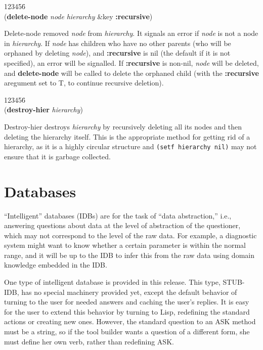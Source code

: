 \begin{tabbing}
123456\= \kill
\\
({\bf delete-node} {\it node\/} {\it hierarchy\/} \&key {\bf :recursive}) 
\end{tabbing}
Delete-node removed {\it node} from {\it hierarchy\/}. It signals an
error if {\it node} is not a node in {\it hierarchy}. If {\it node}
has children who have no other parents (who will be orphaned by
deleting {\it node\/}), and {\bf :recursive} is nil (the default if it
is not specified), an error will be signalled. If {\bf :recursive} is
non-nil, {\it node} will be deleted, and {\bf delete-node} will be
called to delete the orphaned child (with the {\bf :recursive}
aregument set to T, to continue recursive deletion).

\begin{tabbing}
123456\= \kill
\\
({\bf destroy-hier} {\it hierarchy\/}) 
\end{tabbing}
Destroy-hier destroys {\it hierarchy} by recursively deleting all its
nodes and then deleting the hierarchy itself. This is the appropriate
method for getting rid of a hierarchy, as it is a highly circular
structure and \verb$(setf hierarchy nil)$ may not ensure that it is
garbage collected.





\chapter{Databases}


``Intelligent'' databases (IDBs) are for the task of ``data abstraction,''
i.e., answering questions about data at the level of abstraction of
the questioner, which may not correspond to the level of the raw data.
For example, a diagnostic system might want to know whether a certain
parameter is within the normal range, and it will be up to the IDB to
infer this from the raw data using domain knowledge embedded in the
IDB.

One type of intelligent database is provided in this release.
This type, STUB-IDB, has no special machinery provided yet,
except the default behavior of turning to the user for needed answers
and caching the user's replies.  It is easy for the user to extend this
behavior by turning to Lisp, redefining the standard actions or
creating new ones. However, the standard question to an ASK method
must be a string, so if the tool builder wants a question of a
different form, she must define her own verb, rather than redefining ASK.

